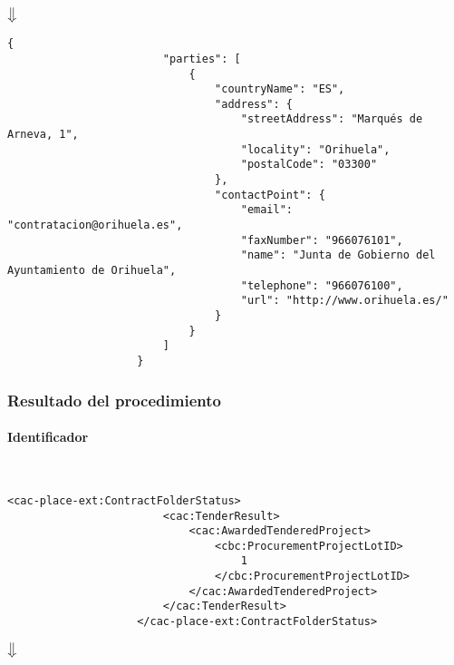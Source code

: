                 \begin{center}
                    $\big\Downarrow$
                \end{center}
                
                \begin{lstlisting}[language=lJSON]
                    {
                        "parties": [
                            {
                                "countryName": "ES",
                                "address": {
                                    "streetAddress": "Marqués de Arneva, 1",
                                    "locality": "Orihuela",
                                    "postalCode": "03300"
                                },
                                "contactPoint": {
                                    "email": "contratacion@orihuela.es",
                                    "faxNumber": "966076101",
                                    "name": "Junta de Gobierno del Ayuntamiento de Orihuela",
                                    "telephone": "966076100",
                                    "url": "http://www.orihuela.es/"
                                }
                            }
                        ]
                    }
                \end{lstlisting}
            
        \subsubsection{Resultado del procedimiento}
            \paragraph{Identificador} \mbox{}\\
                \begin{lstlisting}[language=lXML]
                    <cac-place-ext:ContractFolderStatus>
                        <cac:TenderResult>
                            <cac:AwardedTenderedProject>
                                <cbc:ProcurementProjectLotID>
                                    1
                                </cbc:ProcurementProjectLotID>
                            </cac:AwardedTenderedProject>
                        </cac:TenderResult>
                    </cac-place-ext:ContractFolderStatus>
                \end{lstlisting}
                
                \begin{center}
                    $\big\Downarrow$
                \end{center}
                
